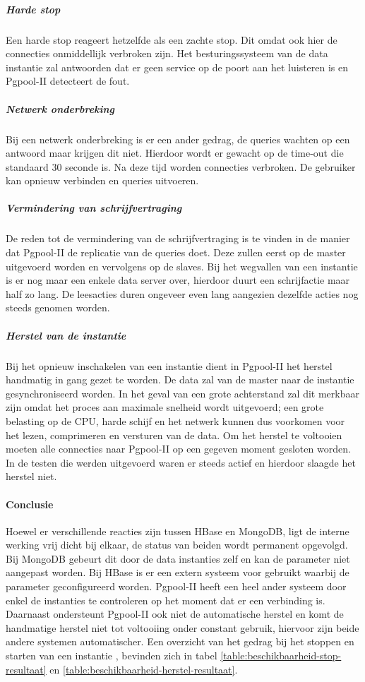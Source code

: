 \subparagraph{Harde stop} Een harde stop reageert hetzelfde als een zachte stop. Dit omdat ook hier de connecties onmiddellijk verbroken zijn. Het besturingssysteem van de data instantie zal antwoorden dat er geen service op de poort aan het luisteren is en Pgpool-II detecteert de fout. 

\subparagraph{Netwerk onderbreking} Bij een netwerk onderbreking is er een ander gedrag, de queries wachten op een antwoord maar krijgen dit niet. Hierdoor wordt er gewacht op de time-out die standaard 30 seconde is. Na deze tijd worden connecties verbroken. De gebruiker kan opnieuw verbinden en queries uitvoeren. 

\subparagraph{Vermindering van schrijfvertraging} De reden tot de vermindering van de schrijfvertraging is te vinden in de manier dat Pgpool-II de replicatie van de queries doet. Deze zullen eerst op de master uitgevoerd worden en vervolgens op de slaves. Bij het wegvallen van een instantie is er nog maar een enkele data server over, hierdoor duurt een schrijfactie maar half zo lang. De leesacties duren ongeveer even lang aangezien dezelfde acties nog steeds genomen worden. 

\subparagraph{Herstel van de instantie} Bij het opnieuw inschakelen van een instantie dient in Pgpool-II het herstel handmatig in gang gezet te worden. De data zal van de master naar de instantie gesynchroniseerd worden. In het geval van een grote achterstand zal dit merkbaar zijn omdat het proces aan maximale snelheid wordt uitgevoerd; een grote belasting op de CPU, harde schijf en het netwerk kunnen dus voorkomen voor het lezen, comprimeren en versturen van de data. Om het herstel te voltooien moeten alle connecties naar Pgpool-II op een gegeven moment gesloten worden. In de testen die werden uitgevoerd waren er steeds actief en hierdoor slaagde het herstel niet. 

\paragraph{Conclusie} Hoewel er verschillende reacties zijn tussen HBase en MongoDB, ligt de interne werking vrij dicht bij elkaar, de status van beiden wordt permanent opgevolgd. Bij MongoDB gebeurt dit door de data instanties zelf en kan de parameter niet aangepast worden. Bij HBase is er een extern systeem voor gebruikt waarbij de parameter geconfigureerd worden. Pgpool-II heeft een heel ander systeem door enkel de instanties te controleren op het moment dat er een verbinding is. 
Daarnaast ondersteunt Pgpool-II ook niet de automatische herstel en komt de handmatige herstel niet tot voltooiing onder constant gebruik, hiervoor zijn beide andere systemen automatischer. Een overzicht van het gedrag bij het stoppen en starten van een instantie , bevinden zich in tabel \ref{table:beschikbaarheid-stop-resultaat} en \ref{table:beschikbaarheid-herstel-resultaat}.

